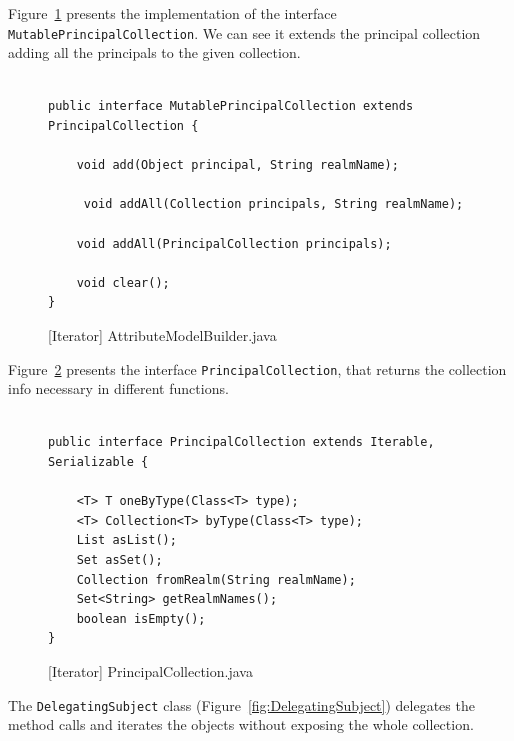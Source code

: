 Figure~\ref{fig:AttributeModelBuilder} presents the implementation of the interface \texttt{MutablePrincipalCollection}. We can see it extends the principal collection adding all the principals to the given collection.

\begin{figure}[htb]
\centering
\lstset{language=Java, basicstyle=\scriptsize, stepnumber=1, showspaces=false, showstringspaces=false,breaklines=true}
\begin{lstlisting}

public interface MutablePrincipalCollection extends PrincipalCollection {

    void add(Object principal, String realmName);

     void addAll(Collection principals, String realmName);

    void addAll(PrincipalCollection principals);

    void clear();
}
\end{lstlisting}
\caption{[Iterator] AttributeModelBuilder.java}
\label{fig:AttributeModelBuilder}
\end{figure}
\FloatBarrier

Figure~\ref{fig:PrincipalCollection} presents the interface \texttt{PrincipalCollection}, that returns the collection info necessary in different functions.

\begin{figure}[htb]
\centering
\lstset{language=Java, basicstyle=\scriptsize, stepnumber=1, showspaces=false, showstringspaces=false,breaklines=true}
\begin{lstlisting}

public interface PrincipalCollection extends Iterable, Serializable {

    <T> T oneByType(Class<T> type);
    <T> Collection<T> byType(Class<T> type);
    List asList();
    Set asSet();
    Collection fromRealm(String realmName);
    Set<String> getRealmNames();
    boolean isEmpty();
}

\end{lstlisting}
\caption{[Iterator] PrincipalCollection.java}
\label{fig:PrincipalCollection}
\end{figure}
\FloatBarrier

The \texttt{DelegatingSubject} class (Figure~\ref{fig:DelegatingSubject}) delegates the method calls and iterates the objects without exposing the whole collection.

